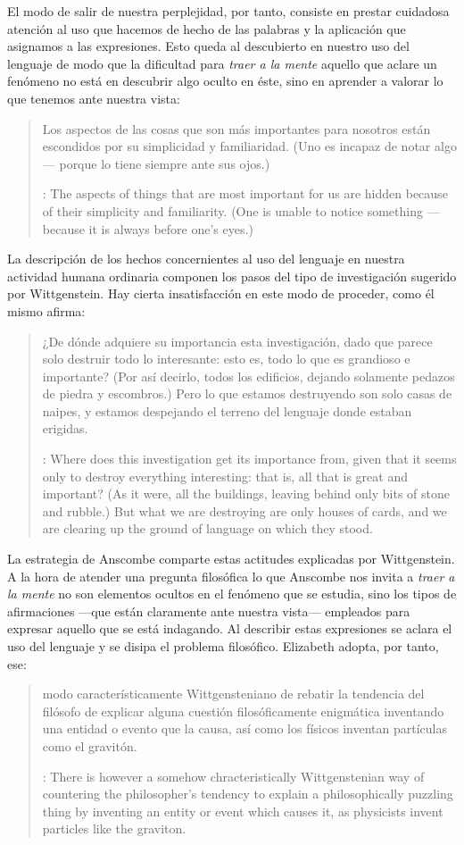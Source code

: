 El modo de salir de nuestra perplejidad, por tanto, consiste en prestar cuidadosa atención al uso que hacemos de hecho de las palabras y la aplicación que asignamos a las expresiones. Esto queda al descubierto en nuestro uso del lenguaje de modo que la dificultad para \emph{traer a la mente} aquello que aclare un fenómeno no está en descubrir algo oculto en éste, sino en aprender a valorar lo que tenemos ante nuestra vista: \blockquote[{\cite[\S129]{wittgenstein1953phiinv}}: The aspects of things that are most important for us are hidden because of their simplicity and familiarity. (One is unable to notice something --- because it is always before one's eyes.)]{Los aspectos de las cosas que son más importantes para nosotros están escondidos por su simplicidad y familiaridad. (Uno es incapaz de notar algo --- porque lo tiene siempre ante sus ojos.)} La descripción de los hechos concernientes al uso del lenguaje en nuestra actividad humana ordinaria componen los pasos del tipo de investigación sugerido por Wittgenstein. Hay cierta insatisfacción en este modo de proceder, como él mismo afirma: \blockquote[{\cite[\S118]{wittgenstein1953phiinv}}: Where does this investigation get its importance from, given that it seems only to destroy everything interesting: that is, all that is great and important? (As it were, all the buildings, leaving behind only bits of stone and rubble.) But what we are destroying are only houses of cards, and we are clearing up the ground of language on which they stood.]{¿De dónde adquiere su importancia esta investigación, dado que parece solo destruir todo lo interesante: esto es, todo lo que es grandioso e importante? (Por así decirlo, todos los edificios, dejando solamente pedazos de piedra y escombros.) Pero lo que estamos destruyendo son solo casas de naipes, y estamos despejando el terreno del lenguaje donde estaban erigidas.}

La estrategia de Anscombe comparte estas actitudes explicadas por Wittgenstein. A la hora de atender una pregunta filosófica lo que Anscombe nos invita a \emph{traer a la mente} no son elementos ocultos en el fenómeno que se estudia, sino los tipos de afirmaciones ---que están claramente ante nuestra vista--- empleados para expresar aquello que se está indagando. Al describir estas expresiones se aclara el uso del lenguaje y se disipa el problema filosófico. Elizabeth adopta, por tanto, ese: \blockquote[{\cite[xix]{anscombe2011plato}}: There is however a somehow chracteristically Wittgenstenian way of countering the philosopher's tendency to explain a philosophically puzzling thing by inventing an entity or event which causes it, as physicists invent particles like the graviton.]{modo característicamente Wittgensteniano de rebatir la tendencia del filósofo de explicar alguna cuestión filosóficamente enigmática inventando una entidad o evento que la causa, así como los físicos inventan partículas como el gravitón.}

